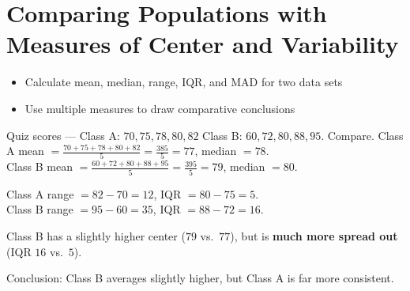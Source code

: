 \section{Comparing Populations with Measures of Center and Variability}

\begin{stepGoal}
\begin{itemize}
    \item Calculate mean, median, range, IQR, and MAD for two data sets
    \item Use multiple measures to draw comparative conclusions
\end{itemize}
\end{stepGoal}

\begin{stepVocabBox}
\end{stepVocabBox}

\begin{stepsCard}
\end{stepsCard}

\begin{stepExample}{Quiz scores — Class A: $70, 75, 78, 80, 82$ \quad Class B: $60, 72, 80, 88, 95$. Compare.}
     Class A mean $= \frac{70+75+78+80+82}{5} = \frac{385}{5} = 77$, median $= 78$.\\
    Class B mean $= \frac{60+72+80+88+95}{5} = \frac{395}{5} = 79$, median $= 80$.

     Class A range $= 82 - 70 = 12$, IQR $= 80 - 75 = 5$.\\
    Class B range $= 95 - 60 = 35$, IQR $= 88 - 72 = 16$.

     Class B has a slightly higher center ($79$ vs.\ $77$), but is \textbf{much more spread out} (IQR $16$ vs.\ $5$).

     Conclusion: Class B averages slightly higher, but Class A is far more consistent.
\end{stepExample}

